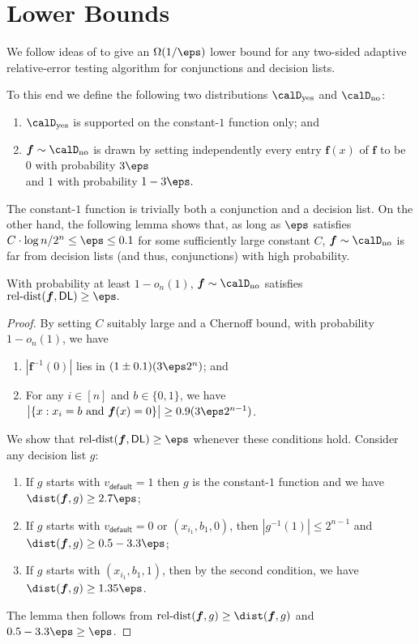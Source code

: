 \documentclass[11pt]{article}
\theoremstyle{definition}
\begin{document}
\def\Dyes{\calD_{\textrm{yes}}}
\def\Dno{\calD_{\textrm{no}}}
\def\bff{\boldsymbol{f}}
\section{Lower Bounds}\label{appendix:lower}

We follow ideas of \cite{BshoutyGoldreich022}
  to give an $\Omega(1/\eps)$ lower bound for any two-sided adaptive relative-error testing algorithm for conjunctions and decision lists.

To this end we define the following two distributions $\Dyes$ and $\Dno$:
\begin{flushleft}\begin{enumerate}
    \item $\Dyes$ is supported on the constant-$1$ function only; and \item $\bff\sim\Dno$ is drawn by setting independently every entry $\bff(x)$ of $\bff$ to be $0$ with probability $3\eps$\\ and $1$ with probability $1-3\eps.$
\end{enumerate}\end{flushleft}
The constant-$1$ function is trivially both a conjunction and 
  a decision list.
On the other hand, the following lemma shows that, as long as $\eps$ satisfies $C\cdot {\log n}/2^n\le \eps\le 0.1$ for some sufficiently large constant $C$,  
  $\bff\sim \Dno$ is far from decision lists (and thus, conjunctions) with high probability. 

\begin{lemma}
With probability at least $1-o_n(1)$,
  $\bff\sim \Dno$ satisfies $\reldist(\bff,\textsf{DL})\ge \eps.$
\end{lemma}
\begin{proof}
By setting $C$ suitably large and a Chernoff bound,
  with probability  $1-o_n(1)$, we have
\begin{enumerate}
    \item $|\bff^{-1}(0)|$ 
  lies in $(1\pm 0.1)(3\eps 2^n)$; and
  \item For any $i\in [n]$ and $b\in \{0,1\}$, we have $\big|\{x: x_i=b\ \text{and}\ \bff(x)=0\}\big|\ge 0.9(3\eps 2^{n-1})$.
\end{enumerate}
We show that $\reldist(\bff,\textsf{DL})\ge \eps$ whenever these conditions hold. Consider any decision list $g$:
\begin{enumerate}
\item If $g$ starts with $v_{\textsf{default}}=1$ then $g$ is the constant-$1$ function and we have $\dist(\bff,g)\ge 2.7\eps $;
\item If $g$ starts with $v_{\textsf{default}}=0$ or $(x_{i_1},b_1,0)$, then $|g^{-1}(1)|\le 2^{n-1}$ and $\dist(\bff,g)\ge 0.5-3.3\eps$;
\item If $g$ starts with $(x_{i_1},b_1,1)$,
  then by the second condition, we have 
  $\dist(\bff,g)\ge 1.35\eps$.
\end{enumerate}
The lemma then follows from $\reldist(\bff,g)\ge \dist(\bff,g)$ 
  and $0.5-3.3\eps\ge \eps$.
\end{proof}
\end{document}
